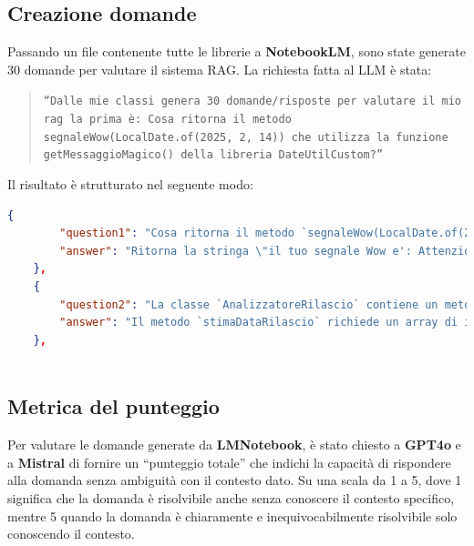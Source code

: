 \documentclass[12pt,a4paper,openright,twoside]{book}
\begin{document}
\subsection{Creazione domande}
Passando un file contenente tutte le librerie a \textbf{NotebookLM}, sono state generate 30 domande per valutare il sistema RAG.
La richiesta fatta al LLM è stata:
\begin{quote}
    \texttt{``Dalle mie classi genera 30 domande/risposte per valutare il mio rag la prima è:
    \newline Cosa ritorna il metodo segnaleWow(LocalDate.of(2025, 2, 14))
    che utilizza la funzione getMessaggioMagico() della libreria
    DateUtilCustom?''}
\end{quote}
Il risultato è strutturato nel seguente modo:
\begin{lstlisting}[language=json, caption={Domande/Risposte generate da NotebookLM}]
    {
        "question1": "Cosa ritorna il metodo `segnaleWow(LocalDate.of(2025, 2, 14))` che utilizza la funzione `getMessaggioMagico()` della libreria `DateUtilCustom`?",
        "answer": "Ritorna la stringa \"il tuo segnale Wow e': Attenzione agli incantesimi del crepuscolo.\""
    },
    {
        "question2": "La classe `AnalizzatoreRilascio` contiene un metodo chiamato `stimaDataRilascio`. Quali sono i due parametri di input richiesti da questo metodo?",
        "answer": "Il metodo `stimaDataRilascio` richiede un array di interi (`int[] taskCompletati`) e un valore double (`double velocitaSviluppo`) come input."
    },
 
\end{lstlisting}
\subsection{Metrica del punteggio}
Per valutare le domande generate da \textbf{LMNotebook}, è stato chiesto a \textbf{GPT4o} e a \textbf{Mistral} di 
fornire un ``punteggio totale'' che indichi la capacità di rispondere alla domanda senza ambiguità con il contesto dato.
Su una scala da 1 a 5, dove 1 significa che la domanda è risolvibile anche senza conoscere il contesto specifico, mentre 5 quando la domanda è chiaramente e inequivocabilmente risolvibile solo conoscendo il contesto.
\end{document}
